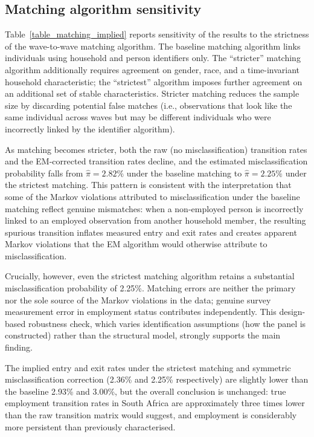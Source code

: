 \subsection{Matching algorithm sensitivity}\label{subsec:alt:matching}

Table~\ref{table_matching_implied} reports sensitivity of the results to the
strictness of the wave-to-wave matching algorithm. The baseline matching
algorithm links individuals using household and person identifiers only.
The ``stricter'' matching algorithm additionally requires agreement on gender,
race, and a time-invariant household characteristic; the ``strictest'' algorithm
imposes further agreement on an additional set of stable characteristics.
Stricter matching reduces the sample size by discarding potential false matches
(i.e., observations that look like the same individual across waves but may be
different individuals who were incorrectly linked by the identifier algorithm).

As matching becomes stricter, both the raw (no misclassification) transition
rates and the EM-corrected transition rates decline, and the estimated
misclassification probability falls from $\hat{\pi} = 2.82\%$ under the
baseline matching to $\hat{\pi} = 2.25\%$ under the strictest matching. This
pattern is consistent with the interpretation that some of the Markov violations
attributed to misclassification under the baseline matching reflect genuine
mismatches: when a non-employed person is incorrectly linked to an employed
observation from another household member, the resulting spurious transition
inflates measured entry and exit rates and creates apparent Markov violations
that the EM algorithm would otherwise attribute to misclassification.

Crucially, however, even the strictest matching algorithm retains a substantial
misclassification probability of 2.25\%. Matching errors are neither the
primary nor the sole source of the Markov violations in the data; genuine survey
measurement error in employment status contributes independently. This design-based
robustness check, which varies identification assumptions (how the panel is
constructed) rather than the structural model, strongly supports the main finding.

The implied entry and exit rates under the strictest matching and symmetric
misclassification correction (2.36\% and 2.25\% respectively) are slightly lower
than the baseline 2.93\% and 3.00\%, but the overall conclusion is unchanged:
true employment transition rates in South Africa are approximately three times
lower than the raw transition matrix would suggest, and employment is considerably
more persistent than previously characterised.
